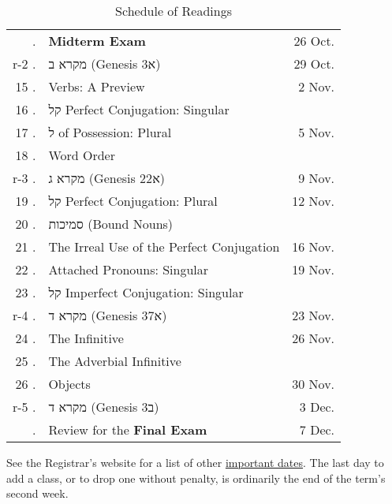 \documentclass[titlepage]{article}
\begin{document}
\begin{table}[phtb]
\begin{tabular}{@{}r<{.}@{ }lr}
    \sessionskip{\rarr} & \textbf{Midterm Exam}                           & 26 Oct.  \\
    r-2 & \texthebrew{מקרא ב} (Genesis 3\texthebrew{א})                   & 29 Oct.  \\
    15  & Verbs: A Preview                                                & 2 Nov.  \\
    16  & \texthebrew{קל} Perfect Conjugation: Singular                   &          \\
    17  & \texthebrew{ל} of Possession: Plural                            & 5 Nov.   \\
    18  & Word Order                                                      &          \\
    r-3 & \texthebrew{מקרא ג} (Genesis 22\texthebrew{א})                  & 9 Nov.   \\
    19  & \texthebrew{קל} Perfect Conjugation: Plural                     & 12 Nov.  \\
    20  & \texthebrew{סמיכות} (Bound Nouns)                               &          \\
    21  & The Irreal Use of the Perfect Conjugation                       & 16 Nov.  \\
    22  & Attached Pronouns: Singular                                     & 19 Nov.  \\
    23  & \texthebrew{קל} Imperfect Conjugation: Singular                 &          \\
    r-4 & \texthebrew{מקרא ד} (Genesis 37\texthebrew{א})                  & 23 Nov.  \\
    24  & The Infinitive                                                  & 26 Nov.  \\
    25  & The Adverbial Infinitive                                        &          \\
    26  & Objects                                                         & 30 Nov.  \\
    r-5 & \texthebrew{מקרא ד} (Genesis 3\texthebrew{ב})                   & 3 Dec.   \\
    \sessionskip{\rarr} & Review for the \textbf{Final Exam}              & 7 Dec.   \\
    \bottomrule
  \end{tabular}
  \caption{Schedule of Readings}
  \label{schedule}
\end{table}

See the Registrar's website for a list of other
\href{http://www.tyndale.ca/registrar/important-dates}{important dates}.
The last day to add a class, or to drop one without penalty, is
ordinarily the end of the term's second week.
\end{document}
